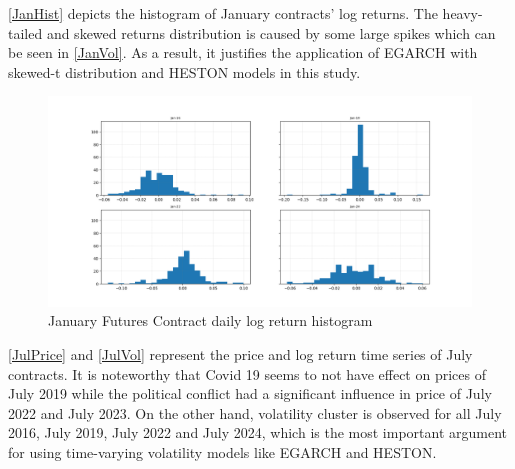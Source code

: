 \documentclass[12pt,a4paper]{article}
\newcommand\colorAutoref[1]{{\hypersetup{linkcolor=black}\autoref{#1}}}
\numberwithin{equation}{section}
\begin{document}
\colorAutoref{JanHist} depicts the histogram of January contracts' log returns. The heavy-tailed and skewed returns distribution is caused by some large spikes which can be seen in \colorAutoref{JanVol}. As a result, it justifies the application of EGARCH with skewed-t distribution and HESTON models in this study.

\begin{figure}[h!] 
\includegraphics[scale=1,width=1\linewidth,height=0.4\textheight]{Jan_returnshist.png}
\caption{January Futures Contract daily log return histogram}
\label{JanHist}
\end{figure}


\colorAutoref{JulPrice} and \colorAutoref{JulVol} represent the price and log return time series of July contracts. It is noteworthy that Covid 19 seems to not have effect on prices of July 2019 while the political conflict had a significant influence in price of July 2022 and July 2023. On the other hand, volatility cluster is observed for all July 2016, July 2019, July 2022 and July 2024, which is the most important argument for using time-varying volatility models like EGARCH and HESTON.
\end{document}
